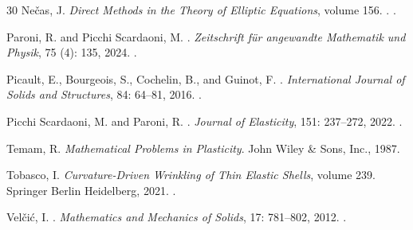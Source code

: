 \documentclass[a4, 11pt, reqno, final]{amsart}
\theoremstyle{plain}%
\begin{document}
\begin{thebibliography}{30}
		Ne{\v{c}}as, J.
		\newblock \emph{{Direct Methods in the Theory of Elliptic Equations}}, volume
		156.
		.
		\newblock {}.

		Paroni, R. and {Picchi Scardaoni}, M.
		.
		\newblock \emph{Zeitschrift f{\"{u}}r angewandte Mathematik und Physik},
		75 (4): 135, 2024.
		\newblock {}.

		Picault, E., Bourgeois, S., Cochelin, B., and Guinot, F.
		.
		\newblock \emph{International Journal of Solids and Structures}, 84:
		64--81, 2016.
		\newblock {}.

		Picchi Scardaoni, M. and Paroni, R.
		.
		\newblock \emph{Journal of Elasticity}, 151:
		237--272, 2022.
		\newblock {}.



		Temam, R.
		\newblock \emph{{Mathematical Problems in Plasticity}}.
		\newblock John Wiley \& Sons, Inc., 1987.

		Tobasco, I.
		\newblock \emph{{Curvature-Driven Wrinkling of Thin Elastic Shells}}, volume
		239.
		\newblock Springer Berlin Heidelberg, 2021.
		\newblock {}.

		Velčić, I.
		.
		\newblock \emph{Mathematics and Mechanics of Solids}, 17:
		781--802, 2012.
		\newblock {}.



	\end{thebibliography}
\end{document}
